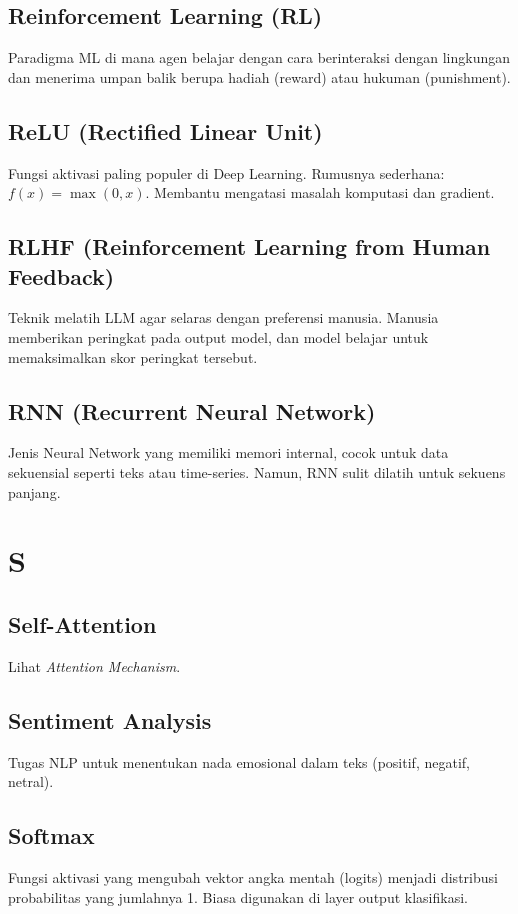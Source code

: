 \subsection*{Reinforcement Learning (RL)}
Paradigma ML di mana agen belajar dengan cara berinteraksi dengan lingkungan dan menerima umpan balik berupa hadiah (reward) atau hukuman (punishment).

\subsection*{ReLU (Rectified Linear Unit)}
Fungsi aktivasi paling populer di Deep Learning. Rumusnya sederhana: $f(x) = \max(0, x)$. Membantu mengatasi masalah komputasi dan gradient.

\subsection*{RLHF (Reinforcement Learning from Human Feedback)}
Teknik melatih LLM agar selaras dengan preferensi manusia. Manusia memberikan peringkat pada output model, dan model belajar untuk memaksimalkan skor peringkat tersebut.

\subsection*{RNN (Recurrent Neural Network)}
Jenis Neural Network yang memiliki memori internal, cocok untuk data sekuensial seperti teks atau time-series. Namun, RNN sulit dilatih untuk sekuens panjang.

\section*{S}

\subsection*{Self-Attention}
Lihat \textit{Attention Mechanism}.

\subsection*{Sentiment Analysis}
Tugas NLP untuk menentukan nada emosional dalam teks (positif, negatif, netral).

\subsection*{Softmax}
Fungsi aktivasi yang mengubah vektor angka mentah (logits) menjadi distribusi probabilitas yang jumlahnya 1. Biasa digunakan di layer output klasifikasi.

